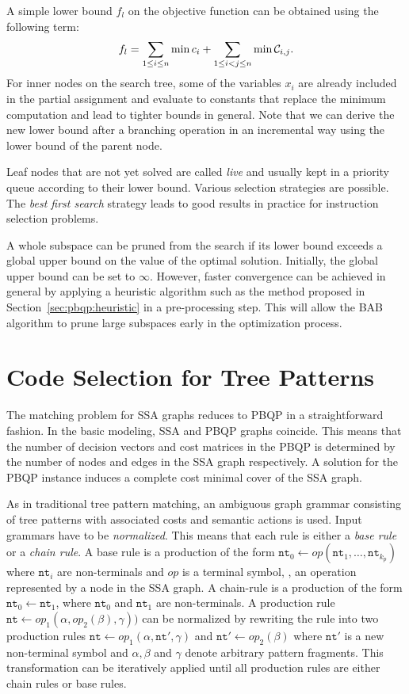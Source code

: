 A simple lower bound $f_l$ on the objective function can be obtained
using the following term:
$$f_l = \sum_{1 \leq i \leq n} \min c_i + \sum_{1 \leq i < j  \leq n}
\min {\mathcal C}_{i,j}.$$ For inner nodes on the search tree, some
of the variables $x_i$ are already included in the partial assignment
and evaluate to constants that replace the minimum computation and
lead to tighter bounds in general. Note that we can derive the new
lower bound after a branching operation in an incremental way using
the lower bound of the parent node.

Leaf nodes that are not yet solved are called \emph{live} and usually
kept in a priority queue according to their lower
bound. Various selection strategies are possible. The
\emph{best first search} strategy leads to good results in practice
for instruction selection problems.

A whole subspace can be pruned from the search if its lower bound
exceeds a global upper bound on the value of the optimal
solution. Initially, the global upper bound can be set to
$\infty$. However, faster convergence can be achieved in general by
applying a heuristic algorithm such as the method proposed in
Section~\ref{sec:pbqp:heuristic} in a pre-processing step. This will
allow the BAB algorithm to prune large subspaces early in the
optimization process.

\section{Code Selection for Tree Patterns}
The matching problem for SSA graphs reduces to PBQP
\cite{EcksteinKS03} in a straightforward fashion. In the basic
modeling, SSA and PBQP graphs coincide. This means that the number of
decision vectors and cost matrices in the PBQP is determined by the
number of nodes and edges in the SSA graph respectively. A solution
for the PBQP instance induces a complete cost minimal cover of the SSA
graph.

As in traditional tree pattern matching, an ambiguous graph grammar
consisting of tree patterns with associated costs and semantic actions
is used. Input grammars have to be \emph{normalized}. This means that
each rule is either a \emph{base rule} or a \emph{chain rule}. A
base rule is a production of the form $\texttt{nt}_0 \leftarrow
\textit{op} ( \texttt{nt}_1, \dots, \texttt{nt}_{k_p} )$ where
$\texttt{nt}_i$ are non-terminals and $\textit{op}$ is a terminal
symbol, \ie, an operation represented by a node in the SSA graph. A
chain-rule is a production of the form $\texttt{nt}_0 \leftarrow
\texttt{nt}_1$, where $\texttt{nt}_0$ and $\texttt{nt}_1$ are
non-terminals.  A production rule $\texttt{nt} \leftarrow
\textit{op}_1 ( \alpha, \textit{op}_2 (\beta), \gamma))$ can be
normalized by rewriting the rule into two production rules
$\texttt{nt} \leftarrow \textit{op}_1 ( \alpha, \texttt{nt}' ,
\gamma)$ and $\texttt{nt}' \leftarrow \textit{op}_2 ( \beta)$ where
$\texttt{nt}'$ is a new non-terminal symbol and $\alpha,\beta$ and
$\gamma$ denote arbitrary pattern fragments.  This transformation can
be iteratively applied until all production rules are either chain
rules or base rules.

